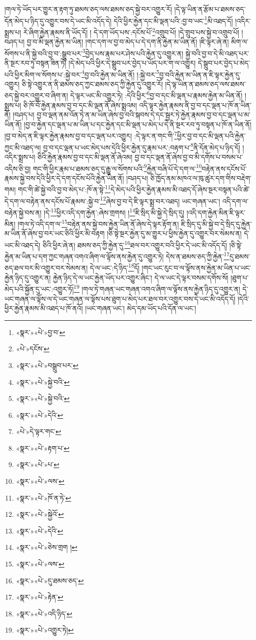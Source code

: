 །གལ་ཏེ་ཡོད་པར་གྱུར་ན་རྟག་ཏུ་ཐམས་ཅད་ལས་ཐམས་ཅད་སྐྱེ་བར་འགྱུར་རོ། །དེ་ལྟ་ཡིན་ན་རྩོམ་པ་ཐམས་ཅད་དོན་མེད་པ་ཉིད་དུ་འགྱུར་བས་དེ་ཡང་མི་འདོད་དེ། དེའི་ཕྱིར་རྐྱེན་དང་མི་ལྡན་པའི་:བྱ་བ་ཡང་\footnote{«སྣར་»«པེ་»བྱ་བ་}མི་འཐད་དོ། །འདིར་སྨྲས་པ། རེ་ཞིག་རྐྱེན་རྣམས་ནི་ཡོད་དོ། །
དེ་དག་ཡོད་པས་:དངོས་པོ་\footnote{«པེ་»དངོས་}འགྲུབ་པོ། །དེ་གྲུབ་པས་སྐྱེ་བ་འགྲུབ་པོ། །བཤད་པ། བྱ་བ་མི་ལྡན་རྐྱེན་མ་ཡིན། །གང་དག་ལ་བྱ་བ་མེད་པ་དེ་དག་ནི་རྐྱེན་མ་ཡིན་ནོ། །ཇི་ལྟར་ཞེ་ན། མིག་ལ་སོགས་པ་ནི་སྐྱེ་བའི་བྱ་བ་:སྒྲུབ་པར་\footnote{«སྣར་»«པེ་»བསྒྲུབ་པར་}བྱེད་པས་རྣམ་པར་ཤེས་པའི་རྐྱེན་དུ་འགྱུར་ན། སྐྱེ་བའི་བྱ་བ་དེ་མི་འཐད་པར་ནི་སྔར་རབ་ཏུ་བསྟན་ཟིན་ཏོ། །དེ་མེད་པའི་ཕྱིར་དེ་སྒྲུབ་པར་བྱེད་པ་ཡོད་པར་ག་ལ་འགྱུར། དེ་སྒྲུབ་པར་བྱེད་པ་མེད་པའི་ཕྱིར་མིག་ལ་སོགས་པ་:སྐྱེ་བར་\footnote{«སྣར་»«པེ་»སྐྱེ་བའི་}བྱ་བའི་རྐྱེན་མ་ཡིན་ནོ། །:སྐྱེ་བར་\footnote{«སྣར་»«པེ་»སྐྱེ་བའི་}བྱ་བའི་རྐྱེན་མ་ཡིན་ན་ཇི་ལྟར་རྐྱེན་དུ་འགྱུར། ཅི་སྟེ་འགྱུར་ན་ནི་ཐམས་ཅད་ཀྱང་ཐམས་ཅད་ཀྱི་རྐྱེན་དུ་འགྱུར་རོ། །དེ་ལྟ་ཡིན་ན་ཐམས་ཅད་ལས་ཐམས་ཅད་སྐྱེ་བར་འགྱུར་བ་ཞིག་ན། དེ་ལྟར་ཡང་མི་འགྱུར་ཏེ། :དེའི་ཕྱིར་\footnote{«སྣར་»«པེ་»དེའི་}བྱ་བ་དང་མི་ལྡན་པ་རྣམས་རྐྱེན་མ་ཡིན་ནོ། །སྨྲས་པ། ཅི་ཁོ་བོ་རྐྱེན་རྣམས་བྱ་བ་དང་མི་ལྡན་ནོ་ཞེས་སྨྲའམ། འདི་ལྟར་རྐྱེན་རྣམས་ནི་བྱ་བ་དང་ལྡན་པ་ཁོ་ན་ཡིན་ནོ། །བཤད་པ། བྱ་བ་ལྡན་ནམ་འོན་ཏེ་ན་མ་ཡིན་ཞེས་བྱ་བའི་སྐབས་དེ་དང་སྦྱར་ཏེ་རྐྱེན་རྣམས་བྱ་བ་དང་ལྡན་པ་མ་ཡིན་ནོ། །བྱ་བ་རྐྱེན་དང་ལྡན་པ་མ་ཡིན་པ་དང་རྐྱེན་དང་མི་ལྡན་པ་མེད་པ་དེ་ནི་སྔར་རབ་ཏུ་བསྟན་པ་ཁོ་ན་ཡིན་ནོ། །བྱ་བ་མེད་ན་ཇི་ལྟར་རྐྱེན་རྣམས་བྱ་བ་དང་ལྡན་པར་འགྱུར། :དེ་ལྟར་ན་གང་གི་\footnote{«པེ་»དེ་ལྟར་གང་}ཕྱིར་བྱ་བ་དང་མི་ལྡན་པའི་རྐྱེན་ཀྱང་མི་འཐད་ལ། བྱ་བ་དང་ལྡན་པ་ཡང་མེད་པས་དེའི་ཕྱིར་རྐྱེན་དུ་རྣམ་པར་:བརྟག་པ་\footnote{«སྣར་»«པེ་»རྟག་པ་}ནི་དོན་མེད་པ་ཉིད་དོ། །འདིར་སྨྲས་པ། ཅིའི་རྐྱེན་རྣམས་བྱ་བ་དང་མི་ལྡན་ནོ་ཞེའམ། བྱ་བ་དང་ལྡན་ནོ་ཞེས་བྱ་བ་མི་དགོས་པ་བསམ་པ་འདིས་ཅི་བྱ། གང་གི་ཕྱིར་རྣམ་པ་ཐམས་ཅད་དུ་རྒྱུ་ལ་སོགས་པའི་\footnote{«སྣར་»«པེ་»པ་}རྐྱེན་བཞི་པོ་དེ་དག་ལ་\footnote{«སྣར་»«པེ་»ལས་}བརྟེན་ནས་དངོས་པོ་རྣམས་སྐྱེ་བས་དེའི་ཕྱིར་དེ་དག་དངོས་པོའི་རྐྱེན་ཡིན་ནོ། །བཤད་པ། ཅི་ཁྱོད་ནམ་མཁའ་ལ་ཁུ་ཚུར་དག་གིས་བརྡེག་གམ། གང་གི་ཚེ་སྐྱེ་བའི་བྱ་བ་མེད་པ་:ཁོ་ན་སྟེ་\footnote{«སྣར་»«པེ་»ཁོ་ན་ཏེ་}དེ་མེད་པའི་ཕྱིར་རྐྱེན་རྣམས་མི་འཐད་དོ་ཞེས་སྔར་བསྟན་པའི་ཚེ་དེ་དག་ལ་བརྟེན་ནས་དངོས་པོ་རྣམས་:སྐྱེ་བ་\footnote{«སྣར་»«པེ་»སྐྱེའོ་}ཞེས་བྱ་བ་དེ་ཇི་ལྟར་སྨྲ་བར་འཐད། ཡང་གཞན་ཡང་། འདི་དག་ལ་བརྟེན་སྐྱེ་བས་ན། །དེ་\footnote{«སྣར་»«པེ་»དེའི་}ཕྱིར་འདི་དག་རྐྱེན་:ཞེས་གྲགས། །\footnote{«སྣར་»«པེ་»ཅེས་གྲག །}ཇི་སྲིད་མི་སྐྱེ་དེ་སྲིད་དུ། །འདི་དག་རྐྱེན་མིན་ཇི་ལྟར་མིན། །གལ་ཏེ་འདི་དག་ལ་\footnote{«སྣར་»«པེ་»ལས་}བརྟེན་ནས་སྐྱེ་བས་རྐྱེན་ཡིན་ནོ་ཞེས་དེ་ལྟར་རྟོག་ན། ཇི་སྲིད་དུ་མི་སྐྱེ་བ་དེ་སྲིད་དུ་རྐྱེན་མ་ཡིན་ནོ་ཞེས་བྱ་བར་ཡང་ཅིའི་ཕྱིར་མི་བརྟག །ཅི་སྟེ་སྔར་རྐྱེན་དུ་མ་གྱུར་པ་ཕྱིས་རྐྱེན་དུ་འགྱུར་བར་སེམས་ན། དེ་ཡང་མི་འཐད་དེ། ཅིའི་ཕྱིར་ཞེ་ན། ཐམས་ཅད་ཀྱི་རྐྱེན་དུ་\footnote{«སྣར་»«པེ་»དུ་ཐམས་ཅད་}ཐལ་བར་འགྱུར་བའི་ཕྱིར་དེ་ཡང་མི་འདོད་དོ། །ཅི་སྟེ་རྐྱེན་མ་ཡིན་པ་དག་ཀྱང་གཞན་འགའ་ཞིག་ལ་ལྟོས་ནས་རྐྱེན་དུ་འགྱུར་ཏེ། དེས་ན་ཐམས་ཅད་ཀྱི་རྐྱེན་\footnote{«སྣར་»«པེ་»རྟེན་}དུ་ཐམས་ཅད་ཐལ་བར་མི་འགྱུར་བར་སེམས་ན། དེ་ལ་ཡང་:དེ་ཉིད་\footnote{«སྣར་»«པེ་»འདི་ཉིད་}དོ། །གང་ཡང་རུང་བ་ལ་ལྟོས་ནས་རྐྱེན་མ་ཡིན་པ་ཡང་རྐྱེན་ཉིད་དུ་འགྱུར་ན། རྐྱེན་ཉིད་དེ་ལ་ཡང་རྐྱེན་ཡོད་པར་འགྱུར་ཞིང་། དེ་ལ་ཡང་དེ་ལྟར་བསམ་དགོས་སོ། །ཐུག་པ་མེད་པའི་སྐྱོན་དུ་ཡང་:འགྱུར་ཏོ།\footnote{«སྣར་»«པེ་»འགྱུར་ཏེ།} །གལ་ཏེ་གཞན་ཡང་གཞན་འགའ་ཞིག་ལ་ལྟོས་ནས་རྐྱེན་ཉིད་དུ་འགྱུར་ན། དེ་ཡང་གཞན་ལ་ལྟོས་ལ་དེ་ཡང་གཞན་ལ་ལྟོས་པས་ཐུག་པ་མེད་པར་ཐལ་བར་འགྱུར་བས་དེ་ཡང་མི་འདོད་དོ། །དེའི་ཕྱིར་རྐྱེན་རྣམས་མི་འཐད་པ་ཁོ་ནའོ། །ཡང་གཞན་ཡང་། མེད་དམ་ཡོད་པའི་དོན་ལ་ཡང་། 